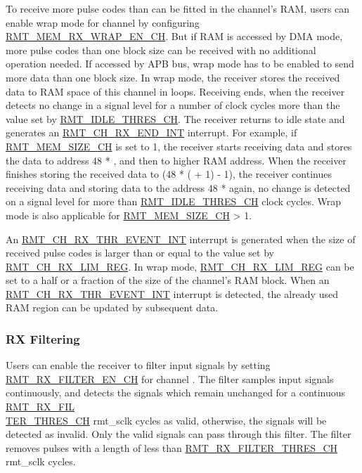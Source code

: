 \documentclass[main\_\_EN.tex]{subfiles}
\begin{document}
To receive more pulse codes than can be fitted in the channel's RAM, users can enable wrap mode for channel  by configuring \hyperref[fielddesc:RMTMEMRXWRAPENCHM]{RMT\_MEM\_RX\_WRAP\_EN\_CH}. But if RAM is accessed by DMA mode, more pulse codes than one block size can be received with no additional operation needed. If accessed by APB bus, wrap mode has to be enabled to send more data than one block size. In wrap mode, the receiver stores the received data to RAM space of this channel in loops. Receiving ends, when the receiver detects no change in a signal level for a number of clock cycles more than the value set by \hyperref[fielddesc:RMTIDLETHRESCHM]{RMT\_IDLE\_THRES\_CH}. The receiver returns to idle state and generates an \hyperref[int:RMTCHnRXENDINT]{RMT\_CH\_RX\_END\_INT} interrupt. For example, if \hyperref[fielddesc:RMTMEMSIZECHM]{RMT\_MEM\_SIZE\_CH} is set to 1, the receiver starts receiving data and stores the data to address 48 * , and then to higher RAM address. When the receiver finishes storing the received data to (48 * ( + 1) - 1), the receiver continues receiving data and storing data to the address 48 *   again, no change is detected on a signal level for more than \hyperref[fielddesc:RMTIDLETHRESCHM]{RMT\_IDLE\_THRES\_CH} clock cycles. Wrap mode is also applicable for \hyperref[fielddesc:RMTMEMSIZECHM]{RMT\_MEM\_SIZE\_CH} > 1.

An \hyperref[int:RMTCHmRXTHREVENTINT]{RMT\_CH\_RX\_THR\_EVENT\_INT} interrupt is generated when the size of received pulse codes is larger than or equal to the value set by \hyperref[fielddesc:RMTCHMRXLIMREG]{RMT\_CH\_RX\_LIM\_REG}.
In wrap mode, \hyperref[fielddesc:RMTCHMRXLIMREG]{RMT\_CH\_RX\_LIM\_REG} can be set to a half or a fraction of the size of the channel's RAM block.
When an \hyperref[int:RMTCHmRXTHREVENTINT]{RMT\_CH\_RX\_THR\_EVENT\_INT} interrupt is detected, the already used RAM region can be updated by subsequent data.



\subsubsection{RX Filtering}

Users can enable the receiver to filter input signals by setting \hyperref[fielddesc:RMTRXFILTERENCHM]{RMT\_RX\_FILTER\_EN\_CH} for channel . The filter samples input signals continuously, and detects the signals which remain unchanged for a continuous \hyperref[fielddesc:RMTRXFILTERTHRESCHM]{RMT\_RX\_FIL\\TER\_THRES\_CH} rmt\_sclk cycles as valid, otherwise, the signals will be detected as invalid. Only the valid signals can pass through this filter. The filter removes pulses with a length of less than \hyperref[fielddesc:RMTRXFILTERTHRESCHM]{RMT\_RX\_FILTER\_THRES\_CH} rmt\_sclk cycles.
\end{document}
